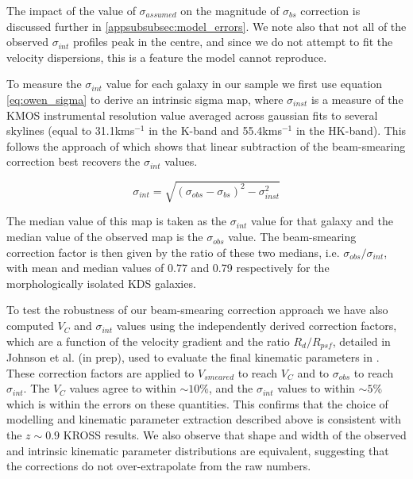 \documentclass[fleqn,usenatbib]{mn2e}
\begin{document}
The impact of the value of $\sigma_{assumed}$ on the magnitude of $\sigma_{bs}$ correction is discussed further in \cref{appsubsubsec:model_errors}.
We note also that not all of the observed $\sigma_{int}$ profiles peak in the centre, and since we do not attempt to fit the velocity dispersions, this is a feature the model cannot reproduce. 

To measure the $\sigma_{int}$ value for each galaxy in our sample we first use equation \ref{eq:owen_sigma} to derive an intrinsic sigma map, where $\sigma_{inst}$ is a measure of the KMOS instrumental resolution value averaged across gaussian fits to several skylines (equal to 31.1kms$^{-1}$ in the K-band and 55.4kms$^{-1}$ in the HK-band).
This follows the approach of \cite{Stott2016} which shows that linear subtraction of the beam-smearing correction best recovers the $\sigma_{int}$ values. 

\begin{equation}\label{eq:owen_sigma}
   \sigma_{int} = \sqrt{\left(\sigma_{obs} - \sigma_{bs} \right)^{2} - \sigma_{inst}^{2}}
\end{equation}

The median value of this map is taken as the $\sigma_{int}$ value for that galaxy and the median value of the observed map is the $\sigma_{obs}$ value.
The beam-smearing correction factor is then given by the ratio of these two medians, i.e. $\sigma_{obs}/\sigma_{int}$, with mean and median values of 0.77 and 0.79 respectively for the morphologically isolated KDS galaxies.


To test the robustness of our beam-smearing correction approach we have also computed $V_{C}$ and $\sigma_{int}$ values using the independently derived correction factors, which are a function of the velocity gradient and the ratio $R_{d}/R_{psf}$, detailed in Johnson et al. (in prep), used to evaluate the final kinematic parameters in \cite{Harrison2017}.
These correction factors are applied to $V_{smeared}$ to reach $V_{C}$ and to $\sigma_{obs}$ to reach $\sigma_{int}$.
The $V_{C}$ values agree to within $\sim10\%$, and the $\sigma_{int}$ values to within $\sim5\%$ which is within the errors on these quantities. 
This confirms that the choice of modelling and kinematic parameter extraction described above is consistent with the $z\sim0.9$ KROSS results.
We also observe that shape and width of the observed and intrinsic kinematic parameter distributions are equivalent, suggesting that the corrections do not over-extrapolate from the raw numbers.
\end{document}
